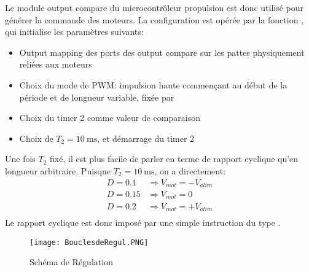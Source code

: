 Le module output compare du microcontrôleur propulsion est donc utilisé pour générer la commande des moteurs. La configuration est opérée par la fonction , qui initialise les paramètres suivants:
\begin{itemize}
  \item Output mapping des ports des output compare sur les pattes physiquement reliées aux moteurs
  \item Choix du mode de PWM: impulsion haute commençant au début de la période et de longueur variable, fixée par 
  \item Choix du timer 2 comme valeur de comparaison
  \item Choix de $T_2 = \SI{10}{\milli\second}$, et démarrage du timer 2
\end{itemize}
Une fois $T_2$ fixé, il est plus facile de parler en terme de rapport cyclique qu'en longueur arbitraire. Puisque $T_2 = \SI{10}{\milli\second}$, on a directement:
\begin{align*}
  D = 0.1 &\Rightarrow V_{mot} = -V_{alim}\\
  D = 0.15 &\Rightarrow V_{mot} = 0\\
  D = 0.2 &\Rightarrow V_{mot} = +V_{alim}\\
\end{align*}
Le rapport cyclique est donc imposé par une simple instruction du type .

\begin{figure}[tbph]
\centering
\texttt{[image: BouclesdeRegul.PNG]}
\caption{\label{fig:BouclesdeRegul}Schéma de Régulation}
\end{figure}

